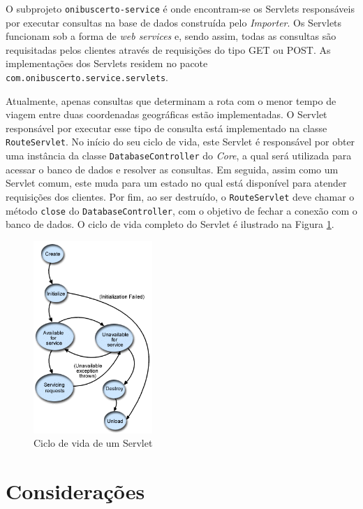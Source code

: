 O subprojeto \texttt{onibuscerto-service} é onde encontram-se os Servlets responsáveis por executar consultas na base de dados construída pelo \emph{Importer}.
Os Servlets funcionam sob a forma de \emph{web services} e, sendo assim, todas as consultas são requisitadas pelos clientes através de requisições  do tipo GET ou POST.
As implementações dos Servlets residem no pacote \texttt{com.onibuscerto.service.servlets}.

Atualmente, apenas consultas que determinam a rota com o menor tempo de viagem entre duas coordenadas geográficas estão implementadas.
O Servlet responsável por executar esse tipo de consulta está implementado na classe \texttt{RouteServlet}.
No início do seu ciclo de vida, este Servlet é responsável por obter uma instância da classe \texttt{DatabaseController} do \emph{Core}, a qual será utilizada para acessar o banco de dados e resolver as consultas.
Em seguida, assim como um Servlet comum, este muda para um estado no qual está disponível para atender requisições dos clientes.
Por fim, ao ser destruído, o \texttt{RouteServlet} deve chamar o método \texttt{close} do \texttt{DatabaseController}, com o objetivo de fechar a conexão com o banco de dados.
O ciclo de vida completo do Servlet é ilustrado na Figura \ref{fig:servletciclo}.

\begin{figure}[!htb]
	\centering
	\includegraphics[width=0.4\textwidth]{./imgs/servletciclo.png}
	\caption[Ciclo de vida de um Servlet]{Ciclo de vida de um Servlet}
	\label{fig:servletciclo}
\end{figure}

\section{Considerações}
